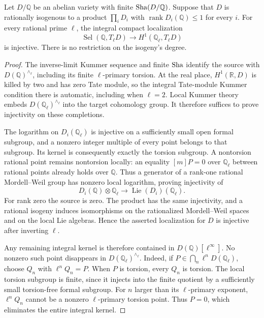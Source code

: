 \begin{lemma}
\label{lem:rank-one-compact-localization}
Let $D/\mathbb Q$ be an abelian variety with finite
$\operatorname{Sha}(D/\mathbb Q)$. Suppose that $D$ is rationally isogenous to
a product $\prod_iD_i$ with
$\operatorname{rank}D_i(\mathbb Q)\le1$ for every $i$.
For every rational prime $\ell$, the integral compact localization
\[
 \operatorname{Sel}(\mathbb Q,T_\ell D)
       \longrightarrow H^1(\mathbb Q_\ell,T_\ell D)
\]
is injective. There is no restriction on the isogeny's degree.
\end{lemma}
\begin{proof}
The inverse-limit Kummer sequence and finite $\operatorname{Sha}$ identify the
source with $D(\mathbb Q)^{\wedge_\ell}$, including its finite
$\ell$-primary torsion. At the real place, $H^1(\mathbb R,D)$ is
killed by two and has zero Tate module, so the integral Tate-module
Kummer condition there is automatic, including when $\ell=2$.
Local Kummer theory embeds
$D(\mathbb Q_\ell)^{\wedge_\ell}$ into the target cohomology group.
It therefore suffices to prove injectivity on these completions.

The logarithm on $D_i(\mathbb Q_\ell)$ is injective on a sufficiently
small open formal subgroup, and a nonzero integer multiple of every
point belongs to that subgroup. Its kernel is consequently exactly
the torsion subgroup. A nontorsion rational point remains nontorsion
locally: an equality $[m]P=0$ over $\mathbb Q_\ell$ between rational
points already holds over $\mathbb Q$. Thus a generator of a rank-one
rational Mordell--Weil group has nonzero local logarithm, proving
injectivity of
\[
 D_i(\mathbb Q)\otimes\mathbb Q_\ell
       \longrightarrow\operatorname{Lie}(D_i)(\mathbb Q_\ell).
\]
For rank zero the source is zero. The product has the same
injectivity, and a rational isogeny induces isomorphisms on the
rationalized Mordell--Weil spaces and on the local Lie algebras.
Hence the asserted localization for $D$ is injective after
inverting $\ell$.

Any remaining integral kernel is therefore contained in
$D(\mathbb Q)[\ell^\infty]$. No nonzero such point disappears in
$D(\mathbb Q_\ell)^{\wedge_\ell}$. Indeed, if
$P\in\bigcap_n\ell^nD(\mathbb Q_\ell)$, choose $Q_n$ with
$\ell^nQ_n=P$. When $P$ is torsion, every $Q_n$ is torsion.
The local torsion subgroup is finite, since it injects into the
finite quotient by a sufficiently small torsion-free formal
subgroup. For $n$ larger than its $\ell$-primary exponent,
$\ell^nQ_n$ cannot be a nonzero $\ell$-primary torsion point.
Thus $P=0$, which eliminates the entire integral kernel.
\end{proof}

